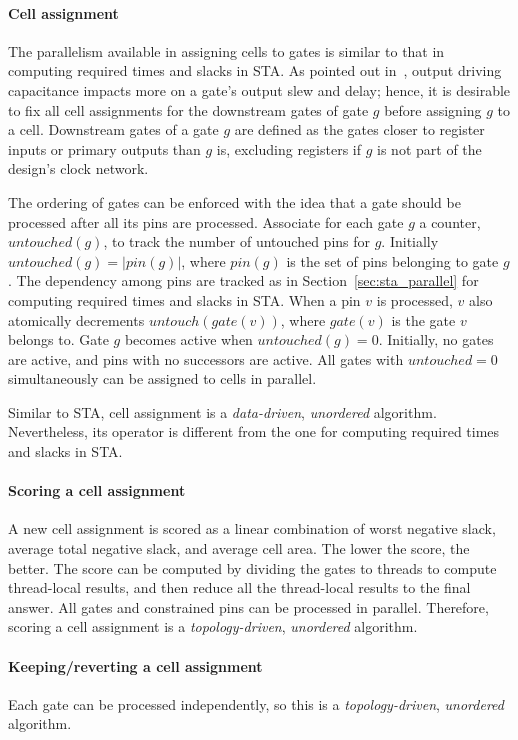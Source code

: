 \paragraph{Cell assignment} The parallelism available in assigning cells to gates is similar to that in computing required times and slacks in STA. As pointed out in~\cite{Held:Gate}, output driving capacitance impacts more on a gate's output slew and delay; hence, it is desirable to fix all cell assignments for the downstream gates of gate $g$ before assigning $g$ to a cell. Downstream gates of a gate $g$ are defined as the gates closer to register inputs or primary outputs than $g$ is, excluding registers if $g$ is not part of the design's clock network.

The ordering of gates can be enforced with the idea that a gate should be processed after all its pins are processed. Associate for each gate $g$ a counter, $untouched(g)$, to track the number of untouched pins for $g$. Initially $untouched(g) = |pin(g)|$, where $pin(g)$ is the set of pins belonging to gate $g$. The dependency among pins are tracked as in Section~\ref{sec:sta_parallel} for computing required times and slacks in STA. When a pin $v$ is processed, $v$ also atomically decrements $untouch(gate(v))$, where $gate(v)$ is the gate $v$ belongs to. Gate $g$ becomes active when $untouched(g) = 0$. Initially, no gates are active, and pins with no successors are active. All gates with $untouched = 0$ simultaneously can be assigned to cells in parallel.

Similar to STA, cell assignment is a {\em data-driven}, {\em unordered} algorithm. Nevertheless, its operator is different from the one for computing required times and slacks in STA.

\paragraph{Scoring a cell assignment} A new cell assignment is scored as a linear combination of worst negative slack, average total negative slack, and average cell area. The lower the score, the better. The score can be computed by dividing the gates to threads to compute thread-local results, and then reduce all the thread-local results to the final answer. All gates and constrained pins can be processed in parallel. Therefore, scoring a cell assignment is a {\em topology-driven}, {\em unordered} algorithm.

\paragraph{Keeping/reverting a cell assignment} Each gate can be processed independently, so this is a {\em topology-driven}, {\em unordered} algorithm.

